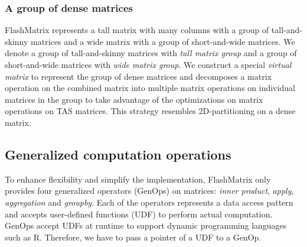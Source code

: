 \subsubsection{A group of dense matrices} \label{sec:mat_group}
FlashMatrix represents a tall matrix with many columns with a group of
tall-and-skinny matrices and a wide matrix with a group of short-and-wide
matrices. We denote a group of tall-and-skinny matrices with \textit{tall
matrix group} and a group of short-and-wide matrices with \textit{wide matrix
group}. We construct a special \textit{virtual matrix} to represent
the group of dense matrices and decomposes a matrix operation on the combined
matrix into multiple matrix operations on individual matrices in the group to
take advantage of the optimizations on matrix operations on TAS matrices.
This strategy resembles 2D-partitioning on a dense matrix.




\subsection{Generalized computation operations} \label{sec:genop}
To enhance flexibility and simplify the implementation, FlashMatrix only
provides four generalized operators (GenOps) on matrices: \textit{inner product},
\textit{apply}, \textit{aggregation} and \textit{groupby}. Each of the operators
represents a data access pattern and accepts user-defined functions (UDF) to
perform actual computation. GenOps accept UDFs at runtime to support dynamic
programming languages such as R. Therefore, we have to pass a pointer of a UDF
to a GenOp.

